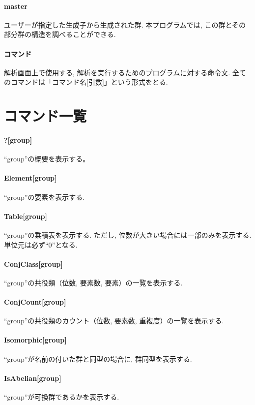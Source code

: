 \documentclass[11pt, a4paper]{jsarticle}
\begin{document}
\paragraph{master}
ユーザーが指定した生成子から生成された群.
本プログラムでは, この群とその部分群の構造を調べることができる.

\paragraph{コマンド}
解析画面上で使用する, 解析を実行するためのプログラムに対する命令文.
全てのコマンドは「コマンド名[引数]」という形式をとる.

\section{コマンド一覧}
\paragraph{?[group]}
``group''の概要を表示する。

\paragraph{Element[group]}
``group''の要素を表示する.

\paragraph{Table[group]}
``group''の乗積表を表示する.
ただし, 位数が大きい場合には一部のみを表示する.
単位元は必ず``0''となる.

\paragraph{ConjClass[group]}
``group''の共役類（位数, 要素数, 要素）の一覧を表示する.

\paragraph{ConjCount[group]}
``group''の共役類のカウント（位数, 要素数, 重複度）の一覧を表示する.

\paragraph{Isomorphic[group]}
``group''が名前の付いた群と同型の場合に, 群同型を表示する.

\paragraph{IsAbelian[group]}
``group''が可換群であるかを表示する.
\end{document}
